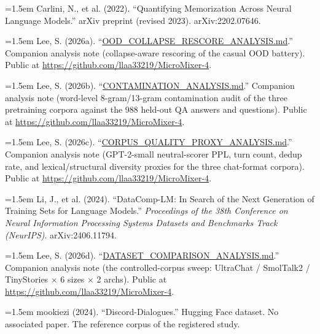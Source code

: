 \documentclass[11pt]{article}
\begin{document}
\par\hangindent=1.5em Carlini, N., et al. (2022). ``Quantifying Memorization Across Neural Language Models.'' arXiv preprint (revised 2023). arXiv:2202.07646.

\par\hangindent=1.5em Lee, S. (2026a). ``\href{https://github.com/llaa33219/MicroMixer-4/blob/4bb630413dfa58ef3141291e121ab8c006d03235/OOD_COLLAPSE_RESCORE_ANALYSIS.md}{OOD\_COLLAPSE\_RESCORE\_ANALYSIS.md}.'' Companion analysis note (collapse-aware rescoring of the casual OOD battery). Public at \url{https://github.com/llaa33219/MicroMixer-4}.

\par\hangindent=1.5em Lee, S. (2026b). ``\href{https://github.com/llaa33219/MicroMixer-4/blob/4bb630413dfa58ef3141291e121ab8c006d03235/CONTAMINATION_ANALYSIS.md}{CONTAMINATION\_ANALYSIS.md}.'' Companion analysis note (word-level 8-gram/13-gram contamination audit of the three pretraining corpora against the 988 held-out QA answers and questions). Public at \url{https://github.com/llaa33219/MicroMixer-4}.

\par\hangindent=1.5em Lee, S. (2026c). ``\href{https://github.com/llaa33219/MicroMixer-4/blob/4bb630413dfa58ef3141291e121ab8c006d03235/CORPUS_QUALITY_PROXY_ANALYSIS.md}{CORPUS\_QUALITY\_PROXY\_ANALYSIS.md}.'' Companion analysis note (GPT-2-small neutral-scorer PPL, turn count, dedup rate, and lexical/structural diversity proxies for the three chat-format corpora). Public at \url{https://github.com/llaa33219/MicroMixer-4}.

\par\hangindent=1.5em Li, J., et al. (2024). ``DataComp-LM: In Search of the Next Generation of Training Sets for Language Models.'' \emph{Proceedings of the 38th Conference on Neural Information Processing Systems Datasets and Benchmarks Track (NeurIPS)}. arXiv:2406.11794.

\par\hangindent=1.5em Lee, S. (2026d). ``\href{https://github.com/llaa33219/MicroMixer-4/blob/4bb630413dfa58ef3141291e121ab8c006d03235/DATASET_COMPARISON_ANALYSIS.md}{DATASET\_COMPARISON\_ANALYSIS.md}.'' Companion analysis note (the controlled-corpus sweep: UltraChat / SmolTalk2 / TinyStories $\times$ 6 sizes $\times$ 2 archs). Public at \url{https://github.com/llaa33219/MicroMixer-4}.

\par\hangindent=1.5em mookiezi (2024). ``Discord-Dialogues.'' Hugging Face dataset. No associated paper. The reference corpus of the registered study.
\end{document}
